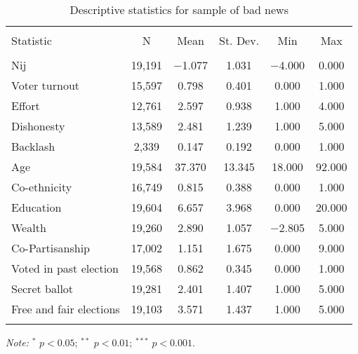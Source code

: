 
\begin{table}[htb] \centering 
  \caption{Descriptive statistics for sample of bad news} 
  \label{} 
\begin{tabular}{@{\extracolsep{1pt}}lccccc} 
\\[-1.8ex]\hline 
\hline \\[-1.8ex] 
Statistic & \multicolumn{1}{c}{N} & \multicolumn{1}{c}{Mean} & \multicolumn{1}{c}{St. Dev.} & \multicolumn{1}{c}{Min} & \multicolumn{1}{c}{Max} \\ 
\hline \\[-1.8ex] 
Nij & 19,191 & $-$1.077 & 1.031 & $-$4.000 & 0.000 \\ 
Voter turnout & 15,597 & 0.798 & 0.401 & 0.000 & 1.000 \\ 
Effort & 12,761 & 2.597 & 0.938 & 1.000 & 4.000 \\ 
Dishonesty & 13,589 & 2.481 & 1.239 & 1.000 & 5.000 \\ 
Backlash & 2,339 & 0.147 & 0.192 & 0.000 & 1.000 \\ 
Age & 19,584 & 37.370 & 13.345 & 18.000 & 92.000 \\ 
Co-ethnicity & 16,749 & 0.815 & 0.388 & 0.000 & 1.000 \\ 
Education & 19,604 & 6.657 & 3.968 & 0.000 & 20.000 \\ 
Wealth & 19,260 & 2.890 & 1.057 & $-$2.805 & 5.000 \\ 
Co-Partisanship & 17,002 & 1.151 & 1.675 & 0.000 & 9.000 \\ 
Voted in past election & 19,568 & 0.862 & 0.345 & 0.000 & 1.000 \\ 
Secret ballot & 19,281 & 2.401 & 1.407 & 1.000 & 5.000 \\ 
Free and fair elections & 19,103 & 3.571 & 1.437 & 1.000 & 5.000 \\ 
\hline \\[-1.8ex] 
\end{tabular} 
\begin{flushleft}\textit{Note:}  $^*$ $p<0.05$; $^{**}$ $p<0.01$; $^{***}$ $p<0.001$. \end{flushleft}
\end{table} 
